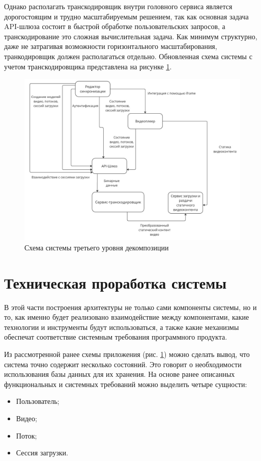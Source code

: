 	Однако располагать транскодировщик внутри головного сервиса является дорогостоящим и трудно масштабируемым решением, так как основная задача API-шлюза состоит в быстрой обработке пользовательских запросов, а транскодирование это сложная вычислительная задача. Как минимум структурно, даже не затрагивая возможности горизонтального масштабирования, транкодировщик должен располагаться отдельно. Обновленная схема системы с учетом транскодировщика представлена на рисунке \ref{fig:system_scheme_3}.
	\begin{figure}[ht!] 
		\center
		\includegraphics [scale=0.37] {my_folder/images//system_scheme_3}
		\caption{Схема системы третьего уровня декомпозиции} 
		\label{fig:system_scheme_3}  
	\end{figure}

\section{Техническая проработка системы} \label{ch2:technical_study}

	В этой части построения архитектуры не только сами компоненты системы, но и то, как именно будет реализовано взаимодействие между компонентами, какие технологии и инструменты будут использоваться, а также какие механизмы обеспечат соответствие системным требования программного продукта.

	Из рассмотренной ранее схемы приложения (рис. \ref{fig:system_scheme_3}) можно сделать вывод, что система точно содержит несколько состояний. Это говорит о необходимости использования базы данных для их хранения. На основе ранее описанных функциональных и системных требований можно выделить четыре сущности:
	\begin{itemize}[label=$\bullet$]
		\item Пользователь;
		\item Видео;
		\item Поток;
		\item Сессия загрузки.
	\end{itemize}

